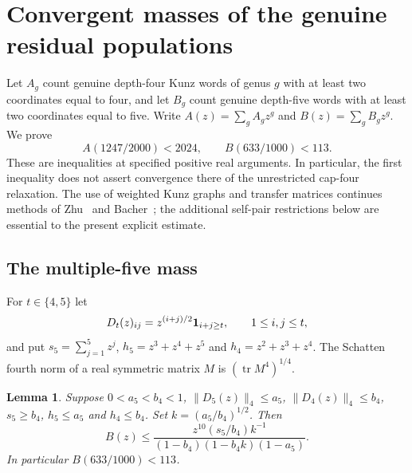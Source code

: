 \documentclass[11pt]{amsart}
\newtheorem{lemma}[theorem]{Lemma}
\theoremstyle{definition}
\theoremstyle{remark}
\numberwithin{equation}{section}
\begin{document}
\section{Convergent masses of the genuine residual populations}
\label{mass:section}

Let $A_g$ count genuine depth-four Kunz words of genus $g$ with at
least two coordinates equal to four, and let $B_g$ count genuine depth-five
words with at least two coordinates equal to five. Write
$A(z)=\sum_g A_gz^g$ and $B(z)=\sum_g B_gz^g$.
We prove
\begin{equation}\label{mass:values}
 A(1247/2000)<2024,\qquad B(633/1000)<113.
\end{equation}
These are inequalities at specified positive real arguments. In particular,
the first inequality does not assert convergence there of the unrestricted
cap-four relaxation. The use of weighted Kunz graphs and transfer matrices
continues methods of Zhu~\cite{Zhu} and Bacher~\cite{Bacher}; the additional
self-pair restrictions below are essential to the present explicit estimate.

\subsection{The multiple-five mass}

For $t\in\{4,5\}$ let
\[
 D_t(z)_{ij}=z^{(i+j)/2}{\bf1}_{i+j\ge t},\qquad 1\le i,j\le t,
\]
and put $s_5=\sum_{j=1}^5z^j$, $h_5=z^3+z^4+z^5$ and
$h_4=z^2+z^3+z^4$. The Schatten fourth norm of a real symmetric matrix
$M$ is $(\operatorname{tr}M^4)^{1/4}$.

\begin{lemma}\label{mass:five}
Suppose $0<a_5<b_4<1$, $\|D_5(z)\|_4\le a_5$,
$\|D_4(z)\|_4\le b_4$, $s_5\ge b_4$, $h_5\le a_5$ and
$h_4\le b_4$. Set $k=(a_5/b_4)^{1/2}$. Then
\[
 B(z)\le \frac{z^{10}(s_5/b_4)k^{-1}}
 {(1-b_4)(1-b_4k)(1-a_5)}.
\]
In particular $B(633/1000)<113$.
\end{lemma}
\end{document}
